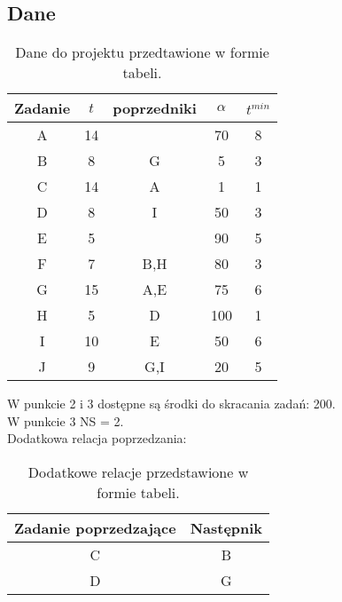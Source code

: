 \documentclass[
    12pt, %
]{../fphw}
\begin{document}
\subsection{Dane}
\begin{table}[H]
    \centering
    \begin{tabular} {| c | c | c | c | c |}
        \hline
        Zadanie & \(t\) & poprzedniki & \(\alpha\) & \(t^{min}\) \\
        \hline
        A       & 14    &             & 70         & 8           \\
        \hline
        B       & 8     & G           & 5          & 3           \\
        \hline
        C       & 14    & A           & 1          & 1           \\
        \hline
        D       & 8     & I           & 50         & 3           \\
        \hline
        E       & 5     &             & 90         & 5           \\
        \hline
        F       & 7     & B,H         & 80         & 3           \\
        \hline
        G       & 15    & A,E         & 75         & 6           \\
        \hline
        H       & 5     & D           & 100        & 1           \\
        \hline
        I       & 10    & E           & 50         & 6           \\
        \hline
        J       & 9     & G,I         & 20         & 5           \\
        \hline
    \end{tabular}
    \caption{Dane do projektu przedtawione w formie tabeli.}
    \label{tab:dane}
\end{table}
W punkcie 2 i 3 dostępne są środki do skracania zadań: 200. \\
W punkcie 3 NS = 2. \\
Dodatkowa relacja poprzedzania: \\
\begin{table}[H]
    \centering
    \begin{tabular}{| c | c |}
        \hline
        Zadanie poprzedzające & Następnik \\
        \hline
        C & B \\
        \hline
        D & G \\
        \hline
    \end{tabular}
    \caption{Dodatkowe relacje przedstawione w formie tabeli.}
    \label{tab:dod_rel}  
\end{table}
\newpage

\lstlistoflistings
\listoffigures
\listoftables
\end{document}
